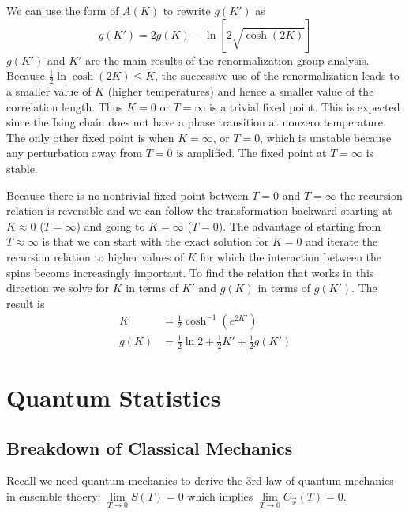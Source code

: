 \documentclass[12pt, a4paper, oneside, openright, titlepage]{book}
\begin{document}
We can use the form of $A(K)$ to rewrite $g(K')$ as \begin{equation*}
    g(K') = 2g(K) - \ln[2\sqrt{\cosh(2K)}]
\end{equation*}
$g(K')$ and $K'$ are the main results of the renormalization group analysis. Because $\frac{1}{2}\ln\cosh(2K) \leq K$, the successive use of the renormalization leads to a smaller value of $K$ (higher temperatures) and hence a smaller value of the correlation length. Thus $K = 0$ or $T = \infty$ is a trivial fixed point. This is expected since the Ising chain does not have a phase transition at nonzero temperature. The only other fixed point is when $K = \infty$, or $T = 0$, which is unstable because any perturbation away from $T = 0$ is amplified. The fixed point at $T = \infty$ is stable. 

Because there is no nontrivial fixed point between $T=0$ and $T=\infty$ the recursion relation is reversible and we can follow the transformation backward starting at $K \approx 0$ ($T=\infty$) and going to $K=\infty$ ($T = 0$). The advantage of starting from $T \approx \infty$ is that we can start with the exact solution for $K = 0$ and iterate the recursion relation to higher values of $K$ for which the interaction between the spins become increasingly important. To find the relation that works in this direction we solve for $K$ in terms of $K'$ and $g(K)$ in terms of $g(K')$. The result is \begin{align*}
    K &= \frac{1}{2}\cosh^{-1}(e^{2K'}) \\
    g(K) &= \frac{1}{2}\ln 2 + \frac{1}{2}K' + \frac{1}{2}g(K')
\end{align*}






\part{Quantum Statistics}


\chapter{Breakdown of Classical Mechanics}

Recall we need quantum mechanics to derive the 3rd law of quantum mechanics in ensemble thoery: $\lim\limits_{T\rightarrow 0}S(T) = 0$ which implies $\lim\limits_{T\rightarrow 0}C_{\vec{x}}(T) = 0$.
\end{document}
